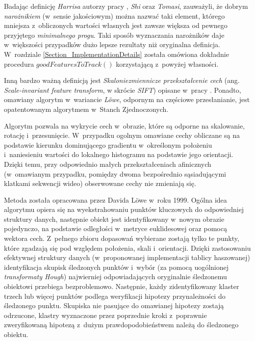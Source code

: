     Badając definicję \textit{Harrisa} autorzy pracy \cite{GoodFeaturesToTrack94}, \textit{Shi} oraz \textit{Tomasi}, zauważyli, że dobrym \textit{narożnikiem} (w~sensie jakościowym) można nazwać taki element, którego mniejsza z~obliczonych wartości własnych jest zawsze większa od pewnego przyjętego \textit{minimalnego progu}. Taki sposób wyznaczania narożników daje w~większości przypadków dużo lepsze rezultaty niż oryginalna definicja. W~rozdziale \ref{Section_ImplementationDetails} została omówiona dokładnie procedura $goodFeaturesToTrack()$ korzystającą z~powyżej własności.

    Inną bardzo ważną definicją jest \textit{Skaloniezmiennicze przekształcenie cech} (ang. \textit{Scale-invariant feature transform}, w skrócie \textit{SIFT}) opisane w~pracy \cite{SalientPointsTracking05}. Ponadto, omawiany algorytm w~wariancie \textit{L\"{o}we}, odpornym na częściowe przesłanianie, jest opatentowanym algorytmem w~Stanch Zjednoczonych.

    Algorytm pozwala na wykrycie cech w~obrazie, które są odporne na skalowanie, rotację i~przesunięcie. W~przypadku ogolnym omawiane cechy obliczane są na podstawie kierunku dominującego gradientu w~określonym położeniu i~naniesieniu wartości do lokalnego histogramu na podstawie jego orientacji. Dzięki temu, przy odpowiednio małych przekształceniach afinicznych (w~omawianym przypadku, pomiędzy dwoma bezpośrednio sąsiadującymi klatkami sekwencji wideo) obserwowane cechy nie zmieniają się.

    Metoda została opracowana przez Davida L\"{o}we w~roku 1999. Ogólna idea algorytmu opiera się na wyekstrahowaniu punktów kluczowych do odpowiedniej struktury danych, następnie obiekt jest identyfikowany w~nowym obrazie pojedynczo, na podstawie odległości w~metryce euklidesowej oraz pomocą wektora cech. Z~pełnego zbioru dopasowań wybierane zostają tylko te punkty, które zgadzają się pod względem położenia, skali i~orientacji. Dzięki zastosowaniu efektywnej struktury danych (w~proponowanej implementacji tablicy haszowanej) identyfikacja skupisk śledzonych punktów i~wybór (za pomocą uogólnionej \textit{transformaty Hough}) najwierniej odpowiadających oryginalnie śledzonemu obiektowi przebiega bezproblemowo. Następnie, każdy zidentyfikowany klaster trzech lub więcej punktów podlega weryfikacji hipotezy przynależności do śledzonego punktu. Skupiska nie pasujące do omawianej hipotezy zostają odrzucone, klastry wyznaczone przez poprzednie kroki z~poprawnie zweryfikowaną hipotezą z~dużym prawdopodobieństwem należą do śledzonego obiektu.

